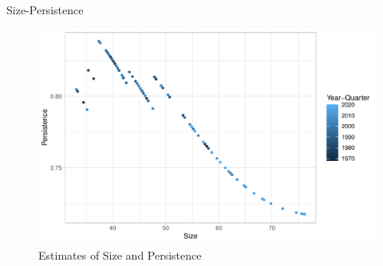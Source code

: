 \documentclass[11pt,pdf,aspectratio=129]{beamer}
\begin{document}
\begin{frame}{Size-Persistence }{}
    \begin{figure}[!hpbt]\centering
        \begin{minipage}{0.8\textwidth}
          \caption{Estimates of Size and Persistence} 
          \label{fig:size_persistence}
          \includegraphics[width=\linewidth]{size_vs_persistence.pdf}
          \end{minipage}
      
      \end{figure}
    
\end{frame}
\end{document}

